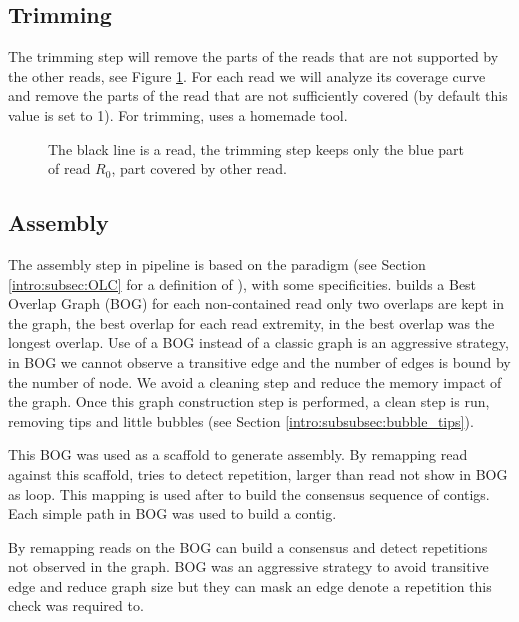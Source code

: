 \documentclass[main]{subfiles}
\begin{document}
\subsection{Trimming}

The trimming step will remove the parts of the reads that are not supported by the other reads, see Figure \ref{sota:fig:canu:trimming}. For each read we will analyze its coverage curve and remove the parts of the read that are not sufficiently covered (by default this value is set to 1). For trimming, \canu uses a homemade tool. 


\begin{figure}[ht]
    \centering
    
    \caption{The black line is a read, the \canu trimming step keeps only the blue part of read $R_0$, part covered by other read.}
    \label{sota:fig:canu:trimming}
\end{figure}

\subsection{Assembly}

The assembly step in \canu pipeline is based on the \OLC paradigm (see Section \ref{intro:subsec:OLC} for a definition of \OLC), with some specificities. \canu builds a Best Overlap Graph (BOG) for each non-contained read only two overlaps are kept in the graph, the best overlap for each read extremity, in \canu the best overlap was the longest overlap. Use of a BOG instead of a classic \OLC graph is an aggressive strategy, in BOG we cannot observe a transitive edge and the number of edges is bound by the number of node. We avoid a cleaning step and reduce the memory impact of the graph. Once this graph construction step is performed, a clean step is run, removing tips and little bubbles (see Section \ref{intro:subsubsec:bubble_tips}).

This BOG was used as a scaffold to generate assembly. By remapping read against this scaffold, \canu tries to detect repetition, larger than read not show in BOG as loop. This mapping is used after to build the consensus sequence of contigs. Each simple path in BOG was used to build a contig. 

By remapping reads on the BOG \canu can build a consensus and detect repetitions not observed in the graph. BOG was an aggressive strategy to avoid transitive edge and reduce graph size but they can mask an edge denote a repetition this check was required to.
\end{document}
